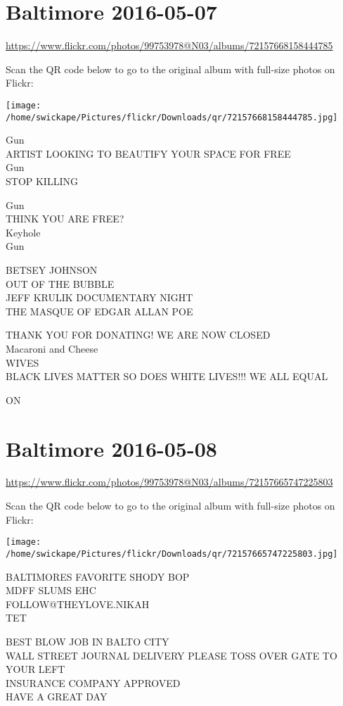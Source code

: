 \documentclass[10pt,letterpaper]{article}
\begin{document}
\section*{Baltimore 2016-05-07}

\url{https://www.flickr.com/photos/99753978@N03/albums/72157668158444785}

Scan the QR code below to go to the original album with full-size photos on Flickr:

\texttt{[image: /home/swickape/Pictures/flickr/Downloads/qr/72157668158444785.jpg]}


Gun\\
ARTIST LOOKING TO BEAUTIFY YOUR SPACE FOR FREE\\
Gun\\
STOP KILLING

Gun\\
THINK YOU ARE FREE?\\
Keyhole\\
Gun

BETSEY JOHNSON\\
OUT OF THE BUBBLE\\
JEFF KRULIK DOCUMENTARY NIGHT\\
THE MASQUE OF EDGAR ALLAN POE

THANK YOU FOR DONATING!  WE ARE NOW CLOSED\\
Macaroni and Cheese\\
WIVES\\
BLACK LIVES MATTER SO DOES WHITE LIVES!!! WE ALL EQUAL

ON


\section*{Baltimore 2016-05-08}

\url{https://www.flickr.com/photos/99753978@N03/albums/72157665747225803}

Scan the QR code below to go to the original album with full-size photos on Flickr:

\texttt{[image: /home/swickape/Pictures/flickr/Downloads/qr/72157665747225803.jpg]}


BALTIMORES FAVORITE SHODY BOP\\
MDFF SLUMS EHC\\
FOLLOW@THEYLOVE.NIKAH\\
TET

BEST BLOW JOB IN BALTO CITY\\
WALL STREET JOURNAL DELIVERY PLEASE TOSS OVER GATE TO YOUR LEFT\\
INSURANCE COMPANY APPROVED\\
HAVE A GREAT DAY
\end{document}
